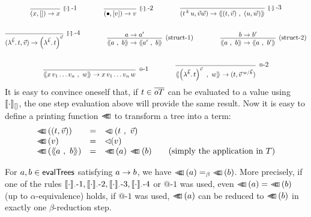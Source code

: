 \documentclass[submission,copyright,creativecommons]{eptcs}
\begin{document}
\begin{gather*}
\infnamed{^{\ev \cdot \cdot \mbox{-1} }}{}{(x , \emptyVec) \osr x}
\qquad
\qquad
\infnamed{^{\ev \cdot \cdot \mbox{-2}}}{}{(\ovar , \ve v) \osr v}
\qquad
\qquad
\infnamed{^{\ev \cdot \cdot \mbox{-3}}}{}{(t \oapp k u , \vec v \vec w) \osr \tree {(t, \vec v)}{(u, \vec w)}}
\\ \\
\infnamed{^{\ev \cdot \cdot \mbox{-4}}}{}{(\LaO {\vec k} t , \vec v) \osr \Val {\vec k} t {\vec v}}
\qquad
\qquad
\infnamed{^{\mbox{(struct-1)}}}{a \osr a'}{\tree a b \osr \tree {a'} b}
\qquad
\qquad
\infnamed{^{\mbox{(struct-2)}}}{b \osr b'}{\tree a b \osr \tree a {b'}}
\\ \\
\infnamed{^{@\mbox{-1}}}{}{\tree {x \sspace v_1 \ldots v_n} w \osr  x \sspace v_1 \ldots v_n \sspace w}
\qquad
\qquad
\infnamed{^{@\mbox{-2}}}{}{\tree {\Val {\vec k} t {\vec v}}{w}   \osr   (t, \multiinsert {\vec v} {\vec k} w)}
\end{gather*}
It is easy to convince oneself that, if $t \in \overline{oT}$ can be evaluated to a value using $\llbracket{\cdot}\rrbracket_{[]}$, the one step evaluation above will provide the same result. 
Now it is easy to define a printing function $\lhd \hspace{-8pt} \lhd \hspace{-8pt} \lhd$ to transform a tree into a term:
\[
\begin{array}{lclll}
\prTree{(t, \vec v)} & = & \pr {t} {\vec v} &&\\
\prTree{v} & = & \prVal v &&\\
\prTree{\tree a b} & = & \ApA {\prTree a}{\prTree b}&& \mbox{(simply the application in $\te$)}
\end{array}
\]
\begin{prop}
 For $a, b \in \mathsf{evalTrees}$ satisfying $a \rightarrow b$, we have $\prTree a =_\beta \prTree b$. More precisely, if one of the rules ${\llbracket{\cdot}\rrbracket_{\cdot} \mbox{-1} }, {\llbracket{\cdot}\rrbracket_{\cdot} \mbox{-2} }, {\llbracket{\cdot}\rrbracket_{\cdot} \mbox{-3} }, {\llbracket{\cdot}\rrbracket_{\cdot} \mbox{-4} }$ or ${@\mbox{-1}}$ was used, even $\prTree a = \prTree b$ (up to $\alpha$-equivalence) holds, if ${@\mbox{-1}}$ was used,  $\lhd \hspace{-8pt} \lhd \hspace{-8pt} \lhd \left( a \right)$ can be reduced to $\lhd \hspace{-8pt} \lhd \hspace{-8pt} \lhd \left( b \right)$ in exactly one $\beta$-reduction step.
\end{prop}
\end{document}
